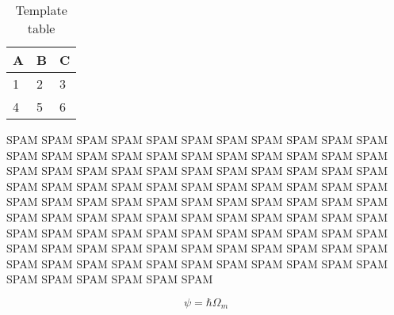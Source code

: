\begin{table}[h]
\centering
\begin{tabular}{l | l | l}
A & B & C  \\
\hline
1 & 2 & 3  \\
4 & 5 & 6
\end{tabular}
\caption{Template table}
\label{temp_table}
\end{table}

SPAM SPAM SPAM SPAM SPAM SPAM SPAM SPAM SPAM SPAM SPAM SPAM SPAM SPAM SPAM SPAM SPAM SPAM SPAM SPAM SPAM SPAM SPAM SPAM SPAM SPAM SPAM SPAM SPAM SPAM SPAM SPAM SPAM SPAM SPAM SPAM SPAM SPAM SPAM SPAM SPAM SPAM SPAM SPAM SPAM SPAM SPAM SPAM SPAM SPAM SPAM SPAM SPAM SPAM SPAM SPAM SPAM SPAM SPAM SPAM SPAM SPAM SPAM SPAM SPAM SPAM SPAM SPAM SPAM SPAM SPAM SPAM SPAM SPAM SPAM SPAM SPAM SPAM SPAM SPAM SPAM SPAM SPAM SPAM SPAM SPAM SPAM SPAM SPAM SPAM SPAM SPAM SPAM SPAM SPAM SPAM SPAM SPAM SPAM SPAM SPAM SPAM SPAM SPAM SPAM 

\begin{equation}
\psi = \hbar\Omega_m
\end{equation}
